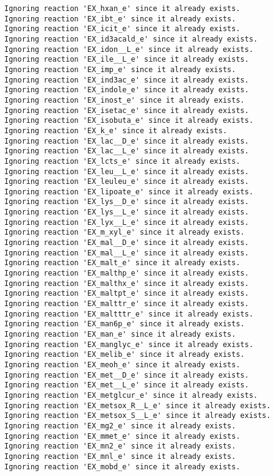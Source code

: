 \documentclass[
  letterpaper,
  DIV=11,
  numbers=noendperiod]{scrartcl}
\begin{document}
\begin{verbatim}
Ignoring reaction 'EX_hxan_e' since it already exists.
Ignoring reaction 'EX_ibt_e' since it already exists.
Ignoring reaction 'EX_icit_e' since it already exists.
Ignoring reaction 'EX_id3acald_e' since it already exists.
Ignoring reaction 'EX_idon__L_e' since it already exists.
Ignoring reaction 'EX_ile__L_e' since it already exists.
Ignoring reaction 'EX_imp_e' since it already exists.
Ignoring reaction 'EX_ind3ac_e' since it already exists.
Ignoring reaction 'EX_indole_e' since it already exists.
Ignoring reaction 'EX_inost_e' since it already exists.
Ignoring reaction 'EX_isetac_e' since it already exists.
Ignoring reaction 'EX_isobuta_e' since it already exists.
Ignoring reaction 'EX_k_e' since it already exists.
Ignoring reaction 'EX_lac__D_e' since it already exists.
Ignoring reaction 'EX_lac__L_e' since it already exists.
Ignoring reaction 'EX_lcts_e' since it already exists.
Ignoring reaction 'EX_leu__L_e' since it already exists.
Ignoring reaction 'EX_leuleu_e' since it already exists.
Ignoring reaction 'EX_lipoate_e' since it already exists.
Ignoring reaction 'EX_lys__D_e' since it already exists.
Ignoring reaction 'EX_lys__L_e' since it already exists.
Ignoring reaction 'EX_lyx__L_e' since it already exists.
Ignoring reaction 'EX_m_xyl_e' since it already exists.
Ignoring reaction 'EX_mal__D_e' since it already exists.
Ignoring reaction 'EX_mal__L_e' since it already exists.
Ignoring reaction 'EX_malt_e' since it already exists.
Ignoring reaction 'EX_malthp_e' since it already exists.
Ignoring reaction 'EX_malthx_e' since it already exists.
Ignoring reaction 'EX_maltpt_e' since it already exists.
Ignoring reaction 'EX_malttr_e' since it already exists.
Ignoring reaction 'EX_maltttr_e' since it already exists.
Ignoring reaction 'EX_man6p_e' since it already exists.
Ignoring reaction 'EX_man_e' since it already exists.
Ignoring reaction 'EX_manglyc_e' since it already exists.
Ignoring reaction 'EX_melib_e' since it already exists.
Ignoring reaction 'EX_meoh_e' since it already exists.
Ignoring reaction 'EX_met__D_e' since it already exists.
Ignoring reaction 'EX_met__L_e' since it already exists.
Ignoring reaction 'EX_metglcur_e' since it already exists.
Ignoring reaction 'EX_metsox_R__L_e' since it already exists.
Ignoring reaction 'EX_metsox_S__L_e' since it already exists.
Ignoring reaction 'EX_mg2_e' since it already exists.
Ignoring reaction 'EX_mmet_e' since it already exists.
Ignoring reaction 'EX_mn2_e' since it already exists.
Ignoring reaction 'EX_mnl_e' since it already exists.
Ignoring reaction 'EX_mobd_e' since it already exists.

\end{verbatim}
\end{document}

